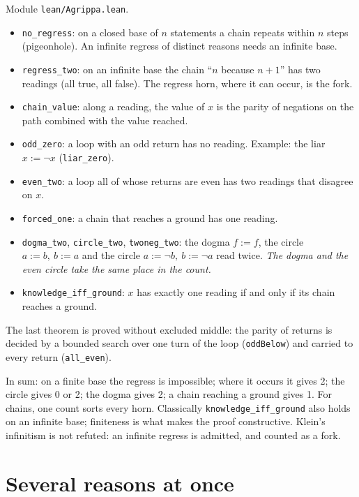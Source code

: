 \documentclass[11pt,a4paper]{article}
\newcommand{\code}[1]{\texttt{#1}}
\begin{document}
Module \code{lean/Agrippa.lean}.
\begin{itemize}
\item \code{no\_regress}: on a closed base of $n$ statements a chain repeats within $n$ steps (pigeonhole). An
  infinite regress of distinct reasons needs an infinite base.
\item \code{regress\_two}: on an infinite base the chain ``$n$ because $n + 1$'' has two readings (all true, all
  false). The regress horn, where it can occur, is the fork.
\item \code{chain\_value}: along a reading, the value of $x$ is the parity of negations on the path combined with the
  value reached.
\item \code{odd\_zero}: a loop with an odd return has no reading. Example: the liar $x := \neg x$ (\code{liar\_zero}).
\item \code{even\_two}: a loop all of whose returns are even has two readings that disagree on $x$.
\item \code{forced\_one}: a chain that reaches a ground has one reading.
\item \code{dogma\_two}, \code{circle\_two}, \code{twoneg\_two}: the dogma $f := f$, the circle $a := b,\ b := a$ and
  the circle $a := \neg b,\ b := \neg a$ read twice. \emph{The dogma and the even circle take the same place in the
  count.}
\item \code{knowledge\_iff\_ground}: $x$ has exactly one reading if and only if its chain reaches a ground.
\end{itemize}
The last theorem is proved without excluded middle: the parity of returns is decided by a bounded search over one
turn of the loop (\code{oddBelow}) and carried to every return (\code{all\_even}).

In sum: on a finite base the regress is impossible; where it occurs it gives 2; the circle gives 0 or 2; the dogma
gives 2; a chain reaching a ground gives 1. For chains, one count sorts every horn. Classically
\code{knowledge\_iff\_ground} also holds on an infinite base; finiteness is what makes the proof constructive. Klein's
infinitism is not refuted: an infinite regress is admitted, and counted as a fork.

\section{Several reasons at once}
\end{document}
